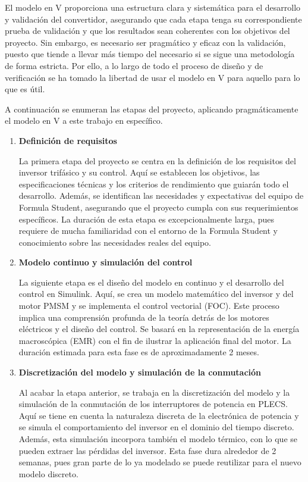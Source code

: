 El modelo en V proporciona una estructura clara y sistemática para el desarrollo y validación del convertidor, asegurando que cada etapa tenga su correspondiente prueba de validación y que los resultados sean coherentes con los objetivos del proyecto. Sin embargo, es necesario ser pragmático y eficaz con la validación, puesto que tiende a llevar más tiempo del necesario si se sigue una metodología de forma estricta. Por ello, a lo largo de todo el proceso de diseño y de verificación se ha tomado la libertad de usar el modelo en V para aquello para lo que es útil.

A continuación se enumeran las etapas del proyecto, aplicando pragmáticamente el modelo en V a este trabajo en específico.
\begin{enumerate}
\item \textbf{Definición de requisitos}

La primera etapa del proyecto se centra en la definición de los requisitos del inversor trifásico y su control. Aquí se establecen los objetivos, las especificaciones técnicas y los criterios de rendimiento que guiarán todo el desarrollo. Además, se identifican las necesidades y expectativas del equipo de Formula Student, asegurando que el proyecto cumpla con sus requerimientos específicos. La duración de esta etapa es excepcionalmente larga, pues requiere de mucha familiaridad con el entorno de la Formula Student y conocimiento sobre las necesidades reales del equipo.

\item \textbf{Modelo continuo y simulación del control}

La siguiente etapa es el diseño del modelo en continuo y el desarrollo del control en Simulink. Aquí, se crea un modelo matemático del inversor y del motor PMSM y se implementa el control vectorial (FOC). Este proceso implica una comprensión profunda de la teoría detrás de los motores eléctricos y el diseño del control. Se basará en la representación de la energía macroscópica (EMR) con el fin de ilustrar la aplicación final del motor. La duración estimada para esta fase es de aproximadamente 2 meses.

\item \textbf{Discretización del modelo y simulación de la conmutación}

Al acabar la etapa anterior, se trabaja en la discretización del modelo y la simulación de la conmutación de los interruptores de potencia en PLECS. Aquí se tiene en cuenta la naturaleza discreta de la electrónica de potencia y se simula el comportamiento del inversor en el dominio del tiempo discreto. Además, esta simulación incorpora también el modelo térmico, con lo que se pueden extraer las pérdidas del inversor. Esta fase dura alrededor de 2 semanas, pues gran parte de lo ya modelado se puede reutilizar para el nuevo modelo discreto.


\end{enumerate}
